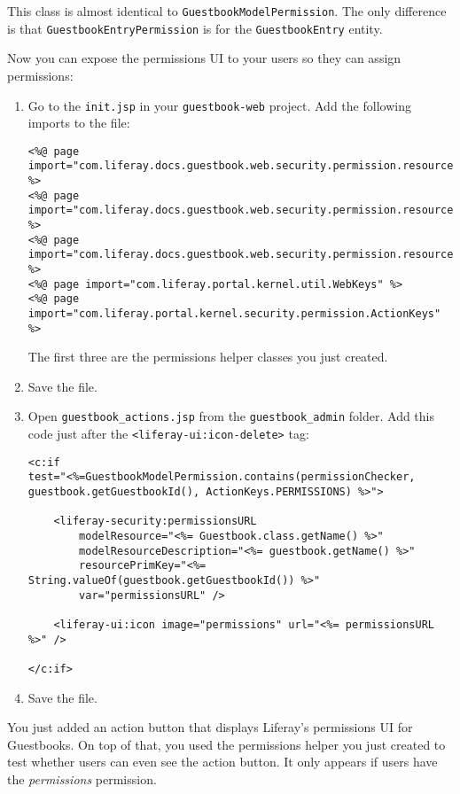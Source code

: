 This class is almost identical to \texttt{GuestbookModelPermission}. The
only difference is that \texttt{GuestbookEntryPermission} is for the
\texttt{GuestbookEntry} entity.

Now you can expose the permissions UI to your users so they can assign
permissions:

\begin{enumerate}
\def\labelenumi{\arabic{enumi}.}
\item
  Go to the \texttt{init.jsp} in your \texttt{guestbook-web} project.
  Add the following imports to the file:

\begin{verbatim}
<%@ page import="com.liferay.docs.guestbook.web.security.permission.resource.GuestbookModelPermission" %>
<%@ page import="com.liferay.docs.guestbook.web.security.permission.resource.GuestbookPermission" %>
<%@ page import="com.liferay.docs.guestbook.web.security.permission.resource.GuestbookEntryPermission" %>
<%@ page import="com.liferay.portal.kernel.util.WebKeys" %>
<%@ page import="com.liferay.portal.kernel.security.permission.ActionKeys" %>
\end{verbatim}

  The first three are the permissions helper classes you just created.
\item
  Save the file.
\item
  Open \texttt{guestbook\_actions.jsp} from the
  \texttt{guestbook\_admin} folder. Add this code just after the
  \texttt{\textless{}liferay-ui:icon-delete\textgreater{}} tag:

\begin{verbatim}
<c:if
test="<%=GuestbookModelPermission.contains(permissionChecker, guestbook.getGuestbookId(), ActionKeys.PERMISSIONS) %>">

    <liferay-security:permissionsURL
        modelResource="<%= Guestbook.class.getName() %>"
        modelResourceDescription="<%= guestbook.getName() %>"
        resourcePrimKey="<%= String.valueOf(guestbook.getGuestbookId()) %>"
        var="permissionsURL" />

    <liferay-ui:icon image="permissions" url="<%= permissionsURL %>" />

</c:if>
\end{verbatim}
\item
  Save the file.
\end{enumerate}

You just added an action button that displays Liferay's permissions UI
for Guestbooks. On top of that, you used the permissions helper you just
created to test whether users can even see the action button. It only
appears if users have the \emph{permissions} permission.

